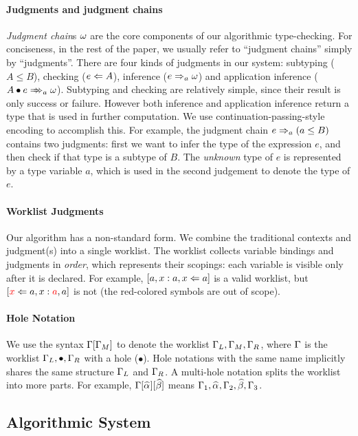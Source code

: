\paragraph{Judgments and judgment chains} 
\emph{Judgment chain}s $\omega$ are the core components of our algorithmic
type-checking. For conciseness, in the rest of the paper, we usually
refer to ``judgment chains'' simply by ``judgments''.  There are four kinds
of judgments in our system: subtyping ($A \le B$), checking ($e\Leftarrow
A$), inference ($e\Rightarrow_{a} \omega$) and
application inference ($\appInfAlg{A}{e}$).  Subtyping and checking are relatively simple,
since their result is only success or failure. However both inference and
application inference return a type that is used in further computation. We use
continuation-passing-style encoding to accomplish this. For example, the judgment
chain $e \Rightarrow_a (a \le B)$ contains two judgments: first we want to
infer the type of the expression $e$, and then check if that type is a
subtype of $B$. The \emph{unknown} type of $e$ is represented by a
type variable $a$, which is used in the second judgement to denote the 
type of $e$.

\paragraph{Worklist Judgments} Our algorithm has a non-standard form.
We combine the traditional contexts and judgment(s) into a single worklist.
The worklist collects variable bindings and judgments in \emph{order}, which represents their scopings:
each variable is visible only after it is declared.
For example, $[a,x:a,x \Leftarrow a]$ is a valid worklist, but $[\textcolor{red}{x} \Leftarrow a, x:\textcolor{red}{a},a]$ is not (the red-colored symbols are out of scope).

\paragraph{Hole Notation}
We use the syntax $\Gamma[\Gamma_M]$ to denote the worklist $\Gamma_L,\Gamma_M,\Gamma_R$,
where $\Gamma$ is the worklist $\Gamma_L,\bullet,\Gamma_R$ with a hole ($\bullet$).
Hole notations with the same name implicitly shares the same structure $\Gamma_L$ and $\Gamma_R$.
A multi-hole notation splits the worklist into more parts.
For example, $\Gm[\al][\bt]$ means $\Gm_1,\al,\Gm_2,\bt,\Gm_3$.

\subsection{Algorithmic System}

